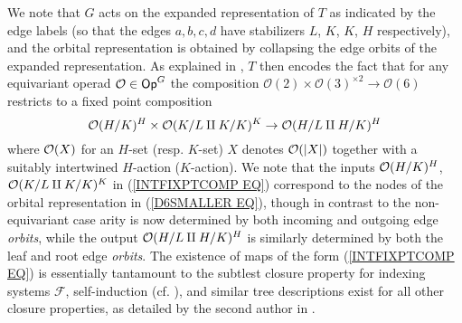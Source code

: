\documentclass[a4paper,10pt]{article}%
\begin{document}
We note that $G$ acts on the expanded representation of $T$ as indicated by the edge labels (so that the edges $a,b,c,d$ have stabilizers $L$, $K$, $K$, $H$ respectively), and the orbital representation is obtained by collapsing the edge orbits of the expanded representation. As explained in \cite[Example 4.9]{Pe17}, $T$ then encodes the fact that for any 
equivariant operad $\mathcal{O} \in \mathsf{Op}^G$ the composition 
$\mathcal{O}(2) \times \mathcal{O}(3)^{\times 2} \to 
\mathcal{O}(6)$ restricts to a fixed point composition
\begin{equation}\label{INTFIXPTCOMP EQ}
\mathcal{O}(H/K)^{H} \times \mathcal{O}(K/L \amalg K/K)^{K} \to
\mathcal{O}(H/L \amalg H/K)^{H}
\end{equation}
where $\mathcal{O}(X)$ for an $H$-set (resp. $K$-set) $X$ denotes $\mathcal{O}(|X|)$ together with a suitably intertwined $H$-action ($K$-action).
We note that the inputs 
$\mathcal{O}(H/K)^{H}$, $\mathcal{O}(K/L \amalg K/K)^{K}$ in
(\ref{INTFIXPTCOMP EQ})
correspond to the nodes of the orbital representation
in (\ref{D6SMALLER EQ}), though in contrast to the non-equivariant case arity is now determined by both incoming and outgoing edge \textit{orbits}, while the output 
$\mathcal{O}(H/L \amalg H/K)^{H}$
is similarly determined by both the leaf and root edge \textit{orbits}.
The existence of maps of the form (\ref{INTFIXPTCOMP EQ}) is essentially tantamount to the subtlest 
closure property for indexing systems $\mathcal{F}$,
self-induction (cf. \cite[Def. 3.20]{BH15}),
and similar tree descriptions exist for all other closure properties, as detailed by the second author in 
\cite[\S 9]{Pe17}.
\end{document}
